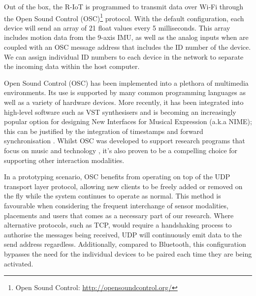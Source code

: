 Out of the box, the R-IoT is programmed to transmit data over Wi-Fi through the Open Sound Control (OSC)\footnote{Open Sound Control: \url{http://opensoundcontrol.org/}} protocol. With the default configuration, each device will send an array of 21 float values every 5 milliseconds. This array includes motion data from the 9-axis IMU, as well as the analog inputs when are coupled with an OSC message address that includes the ID number of the device. We can assign individual ID numbers to each device in the network to separate the incoming data within the host computer.

Open Sound Control (OSC) has been implemented into a plethora of multimedia environments. Its use is supported by many common programming languages as well as a variety of hardware devices. More recently, it has been integrated into high-level software such as VST synthesisers and is becoming an increasingly popular option for designing New Interfaces for Musical Expression (a.k.a NIME); this can be justified by the integration of timestamps and forward synchronisation \cite{schmeder_best_2010}. Whilst OSC was developed to support research programs that focus on music and technology \cite{freed_features_2009}, it’s also proven to be a compelling choice for supporting other interaction modalities.

In a prototyping scenario, OSC benefits from operating on top of the UDP transport layer protocol, allowing new clients to be freely added or removed on the fly while the system continues to operate as normal. This method is favourable when considering the frequent interchange of sensor modalities, placements and users that comes as a necessary part of our research. Where alternative protocols, such as TCP, would require a handshaking process to authorise the messages being received, UDP will continuously emit data to the send address regardless. Additionally, compared to Bluetooth, this configuration bypasses the need for the individual devices to be paired each time they are being activated.

